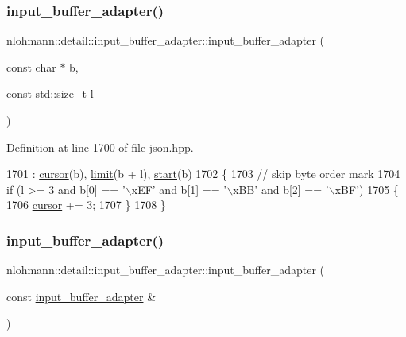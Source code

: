 \subsubsection{\texorpdfstring{input\+\_\+buffer\+\_\+adapter()}{input\_buffer\_adapter()}\hspace{0.1cm}{\footnotesize\ttfamily [1/2]}}
{\footnotesize\ttfamily nlohmann\+::detail\+::input\+\_\+buffer\+\_\+adapter\+::input\+\_\+buffer\+\_\+adapter (\begin{DoxyParamCaption}\item[{const char $\ast$}]{b,  }\item[{const std\+::size\+\_\+t}]{l }\end{DoxyParamCaption})\hspace{0.3cm}{\ttfamily [inline]}}



Definition at line 1700 of file json.\+hpp.


\begin{DoxyCode}
1701         : \hyperlink{classnlohmann_1_1detail_1_1input__buffer__adapter_a49e6c8b6555af489a45ef51737eafa1c}{cursor}(b), \hyperlink{classnlohmann_1_1detail_1_1input__buffer__adapter_a14e1f701754e9cc819af0fc883e6e139}{limit}(b + l), \hyperlink{classnlohmann_1_1detail_1_1input__buffer__adapter_a028e9bb232143d8a2b6b204fa28c3493}{start}(b)
1702     \{
1703         \textcolor{comment}{// skip byte order mark}
1704         \textcolor{keywordflow}{if} (l >= 3 and b[0] == \textcolor{stringliteral}{'\(\backslash\)xEF'} and b[1] == \textcolor{stringliteral}{'\(\backslash\)xBB'} and b[2] == \textcolor{stringliteral}{'\(\backslash\)xBF'})
1705         \{
1706             \hyperlink{classnlohmann_1_1detail_1_1input__buffer__adapter_a49e6c8b6555af489a45ef51737eafa1c}{cursor} += 3;
1707         \}
1708     \}
\end{DoxyCode}
\mbox{\label{classnlohmann_1_1detail_1_1input__buffer__adapter_ada76d7b75c5d6b989af0e18687ef07b6}} 
\subsubsection{\texorpdfstring{input\+\_\+buffer\+\_\+adapter()}{input\_buffer\_adapter()}\hspace{0.1cm}{\footnotesize\ttfamily [2/2]}}
{\footnotesize\ttfamily nlohmann\+::detail\+::input\+\_\+buffer\+\_\+adapter\+::input\+\_\+buffer\+\_\+adapter (\begin{DoxyParamCaption}\item[{const \hyperlink{classnlohmann_1_1detail_1_1input__buffer__adapter}{input\+\_\+buffer\+\_\+adapter} \&}]{ }\end{DoxyParamCaption})\hspace{0.3cm}{\ttfamily [delete]}}



